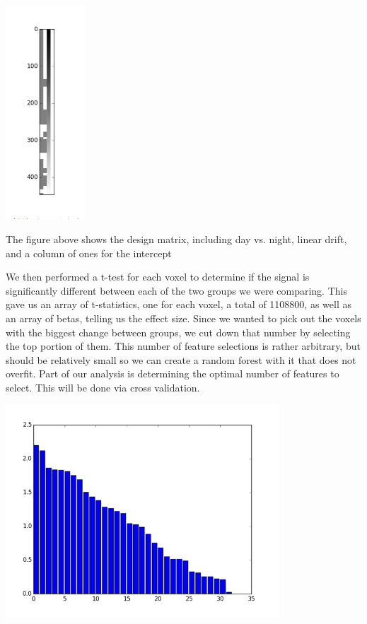 \begin{center}
\includegraphics[height=8cm]{2}
\end{center}

The figure above shows the design matrix, including day vs. night, linear drift, and a column of ones for the intercept

We then performed a t-test for each voxel to determine if the signal is
significantly different between each of the two groups we were comparing.
This gave us an array of t-statistics, one for each voxel, a total of 1108800,
as well as an array of betas, telling us the effect size.  Since we wanted to
pick out the voxels with the biggest change between groups, we cut down that
number by selecting the top portion of them.  This number of feature
selections is rather arbitrary, but should be relatively small so we can
create a random forest with it that does not overfit.  Part of our analysis is
determining the optimal number of features to select. This will be done via
cross validation.

\begin{center}
\includegraphics[height=8cm]{3}
\end{center}

